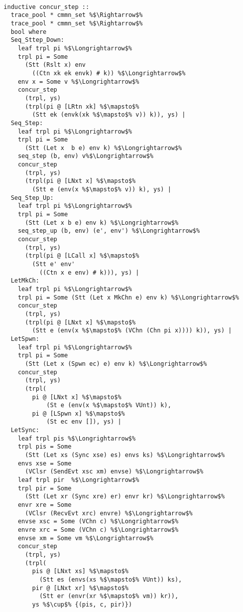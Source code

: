 \documentclass{article}
\begin{document}
\begin{lstlisting}[style=codestyle1, escapechar=\%]

  inductive concur_step ::
    trace_pool * cmmn_set %$\Rightarrow$%
    trace_pool * cmmn_set %$\Rightarrow$%
    bool where 
    Seq_Sttep_Down:
      leaf trpl pi %$\Longrightarrow$%
      trpl pi = Some
        (Stt (Rslt x) env
          ((Ctn xk ek envk) # k)) %$\Longrightarrow$%
      env x = Some v %$\Longrightarrow$%
      concur_step
        (trpl, ys)
        (trpl(pi @ [LRtn xk] %$\mapsto$%
          (Stt ek (envk(xk %$\mapsto$% v)) k)), ys) |
    Seq_Step:
      leaf trpl pi %$\Longrightarrow$%
      trpl pi = Some
        (Stt (Let x  b e) env k) %$\Longrightarrow$%
      seq_step (b, env) v%$\Longrightarrow$%
      concur_step
        (trpl, ys)
        (trpl(pi @ [LNxt x] %$\mapsto$%
          (Stt e (env(x %$\mapsto$% v)) k), ys) |
    Seq_Step_Up: 
      leaf trpl pi %$\Longrightarrow$%
      trpl pi = Some
        (Stt (Let x b e) env k) %$\Longrightarrow$%
      seq_step_up (b, env) (e', env') %$\Longrightarrow$%
      concur_step
        (trpl, ys)
        (trpl(pi @ [LCall x] %$\mapsto$%
          (Stt e' env'
            ((Ctn x e env) # k))), ys) |
    LetMkCh: 
      leaf trpl pi %$\Longrightarrow$%
      trpl pi = Some (Stt (Let x MkChn e) env k) %$\Longrightarrow$%
      concur_step
        (trpl, ys)
        (trpl(pi @ [LNxt x] %$\mapsto$%
          (Stt e (env(x %$\mapsto$% (VChn (Chn pi x)))) k)), ys) |
    LetSpwn:
      leaf trpl pi %$\Longrightarrow$%
      trpl pi = Some
        (Stt (Let x (Spwn ec) e) env k) %$\Longrightarrow$%
      concur_step
        (trpl, ys)
        (trpl(
          pi @ [LNxt x] %$\mapsto$%
              (St e (env(x %$\mapsto$% VUnt)) k), 
          pi @ [LSpwn x] %$\mapsto$%
              (St ec env []), ys) |
    LetSync:
      leaf trpl pis %$\Longrightarrow$%
      trpl pis = Some
        (Stt (Let xs (Sync xse) es) envs ks) %$\Longrightarrow$%
      envs xse = Some
        (VClsr (SendEvt xsc xm) envse) %$\Longrightarrow$%
      leaf trpl pir  %$\Longrightarrow$%
      trpl pir = Some
        (Stt (Let xr (Sync xre) er) envr kr) %$\Longrightarrow$%
      envr xre = Some
        (VClsr (RecvEvt xrc) envre) %$\Longrightarrow$%
      envse xsc = Some (VChn c) %$\Longrightarrow$%
      envre xrc = Some (VChn c) %$\Longrightarrow$%
      envse xm = Some vm %$\Longrightarrow$%
      concur_step
        (trpl, ys)
        (trpl(
          pis @ [LNxt xs] %$\mapsto$%
            (Stt es (envs(xs %$\mapsto$% VUnt)) ks), 
          pir @ [LNxt xr] %$\mapsto$%
            (Stt er (envr(xr %$\mapsto$% vm)) kr)), 
          ys %$\cup$% {(pis, c, pir)})

  \end{lstlisting}
\end{document}
